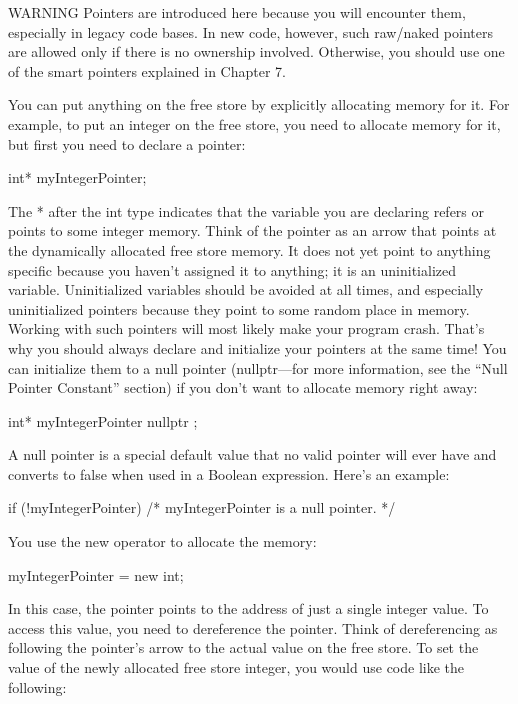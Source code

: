 \begin{myWarning}{WARNING}
Pointers are introduced here because you will encounter them, especially in legacy code bases. In new code, however, such raw/naked pointers are allowed only if there is no ownership involved. Otherwise, you should use one of the smart pointers explained in Chapter 7.
\end{myWarning}


You can put anything on the free store by explicitly allocating memory for it. For example, to put an integer on the free store, you need to allocate memory for it, but first you need to declare a pointer:

\begin{cpp}
int* myIntegerPointer;
\end{cpp}

The * after the int type indicates that the variable you are declaring refers or points to some integer memory. Think of the pointer as an arrow that points at the dynamically allocated free store memory. It does not yet point to anything specific because you haven’t assigned it to anything; it is an uninitialized variable. Uninitialized variables should be avoided at all times, and especially uninitialized pointers because they point to some random place in memory. Working with such pointers will most likely make your program crash. That’s why you should always declare and initialize your pointers at the same time! You can initialize them to a null pointer (nullptr—for more information, see the “Null Pointer Constant” section) if you don’t want to allocate memory right away:

\begin{cpp}
int* myIntegerPointer { nullptr };
\end{cpp}

A null pointer is a special default value that no valid pointer will ever have and converts to false when used in a Boolean expression. Here’s an example:

\begin{cpp}
if (!myIntegerPointer) { /* myIntegerPointer is a null pointer. */ }
\end{cpp}

You use the new operator to allocate the memory:

\begin{cpp}
myIntegerPointer = new int;
\end{cpp}

In this case, the pointer points to the address of just a single integer value. To access this value, you need to dereference the pointer. Think of dereferencing as following the pointer’s arrow to the actual value on the free store. To set the value of the newly allocated free store integer, you would use code like the following:

